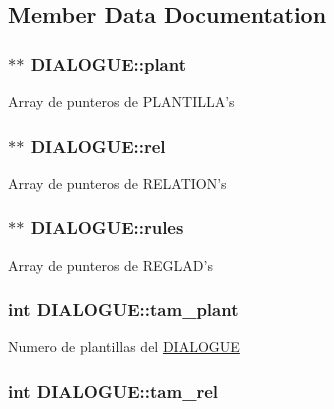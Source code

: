 \subsection{Member Data Documentation}
\hypertarget{structDIALOGUE_a166bb11fea3701fb5f4530aa45c486db}{
\subsubsection[{plant}]{$\ast$$\ast$ {\bf DIALOGUE::plant}}}
\label{structDIALOGUE_a166bb11fea3701fb5f4530aa45c486db}
Array de punteros de PLANTILLA's \hypertarget{structDIALOGUE_aac56467fc2e1c4e06b9d99bf2777da3e}{
\subsubsection[{rel}]{$\ast$$\ast$ {\bf DIALOGUE::rel}}}
\label{structDIALOGUE_aac56467fc2e1c4e06b9d99bf2777da3e}
Array de punteros de RELATION's \hypertarget{structDIALOGUE_aa240a2acbaf76541f088ba497d374909}{
\subsubsection[{rules}]{$\ast$$\ast$ {\bf DIALOGUE::rules}}}
\label{structDIALOGUE_aa240a2acbaf76541f088ba497d374909}
Array de punteros de REGLAD's \hypertarget{structDIALOGUE_a48bd62be46bf120d7206f1058bc8b87d}{
\subsubsection[{tam\_\-plant}]{\setlength{\rightskip}{0pt plus 5cm}int {\bf DIALOGUE::tam\_\-plant}}}
\label{structDIALOGUE_a48bd62be46bf120d7206f1058bc8b87d}
Numero de plantillas del \hyperlink{structDIALOGUE}{DIALOGUE} \hypertarget{structDIALOGUE_a3b4b15ee1d429c354646fe23be1441df}{
\subsubsection[{tam\_\-rel}]{\setlength{\rightskip}{0pt plus 5cm}int {\bf DIALOGUE::tam\_\-rel}}}
